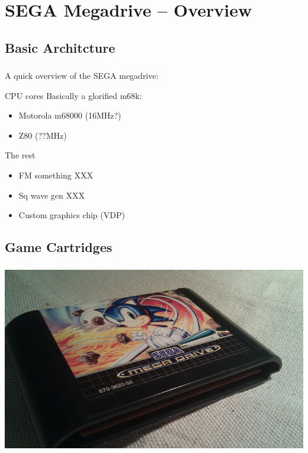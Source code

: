 \documentclass{beamer}
\begin{document}

\section{SEGA Megadrive -- Overview}
\subsection{Basic Architcture}

\begin{frame}[fragile]
\frametitle{\insertsubsection}

A quick overview of the SEGA megadrive:

\begin{block}{CPU cores}
Basically a glorified m68k:

\begin{itemize}
\item Motorola m68000 (16MHz?)
\item Z80 (??MHz)
\end{itemize}
\end{block}

\vfill

\begin{block}{The rest}
\begin{itemize}
\item FM something XXX
\item Sq wave gen XXX
\item Custom graphics chip (VDP)
\end{itemize}
\end{block}

\end{frame}


\subsection{Game Cartridges}

\begin{frame}[fragile]
\frametitle{\insertsubsection}

\begin{center}
\includegraphics[height=0.8\textheight]{img/cart.jpg}
\end{center}

\end{frame}
\end{document}
